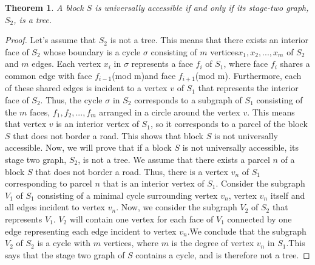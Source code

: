 \documentclass[10pt]{article}
\newtheorem{theorem}{Theorem}
\begin{document}
\begin{theorem}
    A block $S$ is universally accessible if and only if its stage-two graph, $S_2$, is a tree.
\end{theorem}
\begin{proof}
Let's assume that $S_2$ is not a tree.  This means that there exists an interior face of $S_2$ whose boundary is a cycle $\sigma$ consisting of $m$ vertices${x_1, x_2, ...,x_m}$ of $S_2$ and $m$ edges. Each vertex $x_i$ in $\sigma$ represents a face $f_i$ of $S_1$, where face $f_i$ shares a common edge with face $f_{i-1}$(mod m)and face $f_{i+1}$(mod m). Furthermore, each of these shared edges is incident to a vertex $v$ of $S_1$ that represents the interior face of $S_2$. Thus, the cycle $\sigma$ in $S_2$ corresponds to a subgraph of $S_1$ consisting of the $m$ faces, ${f_1, f_2, ..., f_m}$ arranged in a circle around the vertex $v$. This means that vertex $v$ is an interior vertex of $S_1$, so it corresponds to a parcel of the block $S$ that does not border a road. This shows that block $S$ is not universally accessible. Now, we will prove that if a block $S$ is not universally accessible, its stage two graph, $S_2$, is not a tree. We assume that there exists a parcel $n$ of a block $S$ that does not border a road.  Thus, there is a vertex $v_n$ of $S_1$ corresponding to parcel $n$ that is an interior vertex of $S_1$. Consider the subgraph $V_1$ of $S_1$ consisting of a minimal cycle surrounding vertex $v_n$, vertex $v_n$ itself and all edges incident to vertex $v_n$. Now, we consider the subgraph $V_2$ of $S_2$ that represents $V_1$. $V_2$ will contain one vertex for each face of $V_1$ connected by one edge representing each edge incident to vertex $v_n$.We conclude that the subgraph $V_2$ of $S_2$ is a cycle with $m$ vertices, where $m$ is the degree of vertex $v_n$ in $S_1$.This says that the stage two graph of $S$ contains a cycle, and is therefore not a tree.
\end{proof}
\end{document}
